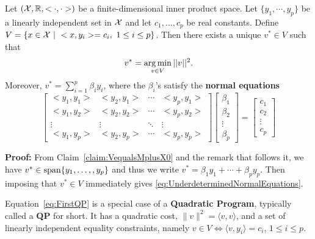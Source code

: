 \begin{thm}
\label{thm:BestApproxLinearVariety}
Let $({\cal X}, \mathbb R, <\cdot, \cdot>)$ be a finite-dimensional inner product space.  Let $\{y_1, \cdots, y_p \}$ be a linearly independent set in ${\cal X}$ and let $c_1, \ldots, c_p$ be real constants.  Define $ V=\{ x\in {\cal X}~|~ <x,y_i>=c_i,~1 \le i \le p\}$. Then there exists a unique $v^*\in V$ such that
\begin{equation}
\label{eq:FirstQP}
    v^* =  \operatorname*{arg\,min}_{v\in V} ||v||^2.
\end{equation} 
Moreover, $v^* = \sum_{i=1}^{p} \beta_i y_i$, where the $\beta_i$'s satisfy the \textbf{normal equations}
\begin{equation}
   \label{eq:UnderdeterminedNormalEquations} 
\left[\begin{array}{cccc}  <y_1, y_1>&    <y_2, y_1> & \cdots &  <y_p, y_1>\\    <y_1, y_2>&  <y_2, y_2> & \cdots &  <y_p, y_2>
\\
\vdots&   \vdots & \ddots &  \vdots
\\
<y_1, y_p>&    <y_2, y_p> & \cdots &  <y_p, y_p>\end{array} \right]  \left[\begin{array}{c} \beta_1 \\ \beta_2 \\ \vdots \\ \beta_p\end{array} \right] =  \left[\begin{array}{c} c_1 \\c_2 \\ \vdots \\ c_p \end{array} \right] 
\end{equation}
\end{thm}

\textbf{Proof:} From Claim~\ref{claim:VequalsMplusX0} and the remark that follows it, we have $v^\ast \in \mathrm{span} \{ y_1, \ldots, ,y_p \}$ and thus we write $v^\ast=\beta_1 y_1+ \cdots +\beta_p y_p$.  Then imposing that $v^\ast \in V$ immediately gives \eqref{eq:UnderdeterminedNormalEquations}.
\Qed


\begin{rem}  Equation~\eqref{eq:FirstQP} is a special case of a \textbf{Quadratic Program}, typically called a \textbf{QP} for short. It has a quadratic cost, $\|v\|^2 = \langle v, v \rangle$, and a set of linearly independent equality constraints, namely $v \in V \iff \langle v, y_i \rangle=c_i$, $1 \le i \le p$.
\end{rem}



